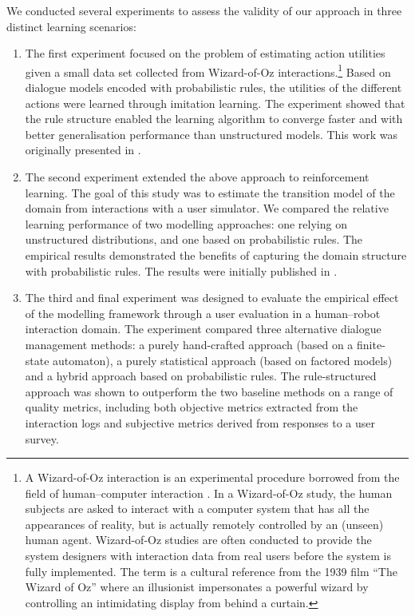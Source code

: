 We conducted several experiments to assess the validity of our approach in three distinct learning scenarios: \begin{enumerate} %

\item The first experiment focused on the problem of estimating action utilities given a small data set collected from Wizard-of-Oz interactions.\footnote{A Wizard-of-Oz interaction is an experimental procedure borrowed from the field of human--computer interaction \citep{woz93}. In a Wizard-of-Oz study, the human subjects are asked to interact with a computer system that has all the appearances of reality, but is actually remotely controlled by an (unseen) human agent.  Wizard-of-Oz studies are often conducted to provide the system designers with interaction data from real users before the system is fully implemented.  The term is a cultural reference from the 1939 film ``The Wizard of Oz'' where an illusionist impersonates a powerful wizard by controlling an intimidating display from behind a curtain.}  Based on dialogue models encoded with probabilistic rules, the utilities of the different actions were learned through imitation learning. The experiment showed that the rule structure enabled the learning algorithm to converge faster and with better generalisation performance than unstructured models. This work was originally presented in \cite{rulebasedmodels-sigdial2012}. 
\item The second experiment extended the above approach to reinforcement learning. The goal of this study was to estimate the transition model of the domain from interactions with a user simulator. We compared the relative learning performance of two modelling approaches: one relying on unstructured distributions, and one based on probabilistic rules. The empirical results demonstrated the benefits of capturing the domain structure with probabilistic rules. The results were initially published in \cite{interspeech2013}. 

\item The third and final experiment was designed to evaluate the empirical effect of the modelling framework through a user evaluation in a human--robot interaction domain. The experiment compared three alternative dialogue management methods: a purely hand-crafted approach (based on a finite-state automaton), a purely statistical approach (based on factored models) and a hybrid approach based on probabilistic rules. The rule-structured approach was shown to outperform the two baseline methods on a range of quality metrics, including both objective metrics extracted from the interaction logs and subjective metrics derived from responses to a user survey. 
\end{enumerate}

